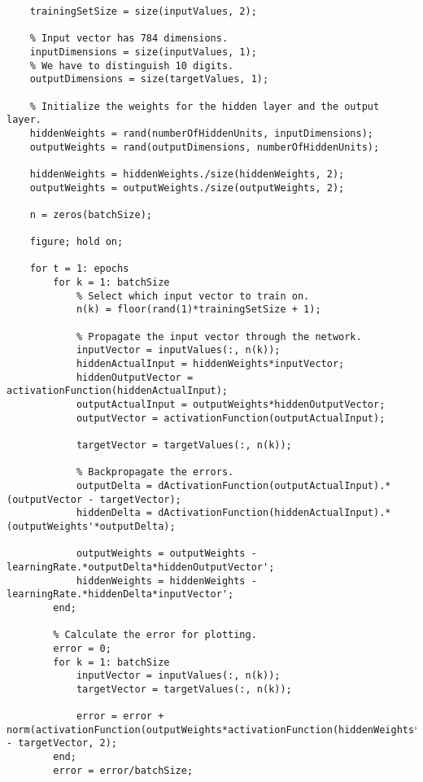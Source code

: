 \begin{appendices}
\begin{lstlisting}[label={lst:train-two-layer-perceptron}]
    % The number of training vectors.
    trainingSetSize = size(inputValues, 2);
    
    % Input vector has 784 dimensions.
    inputDimensions = size(inputValues, 1);
    % We have to distinguish 10 digits.
    outputDimensions = size(targetValues, 1);
    
    % Initialize the weights for the hidden layer and the output layer.
    hiddenWeights = rand(numberOfHiddenUnits, inputDimensions);
    outputWeights = rand(outputDimensions, numberOfHiddenUnits);
    
    hiddenWeights = hiddenWeights./size(hiddenWeights, 2);
    outputWeights = outputWeights./size(outputWeights, 2);
    
    n = zeros(batchSize);
    
    figure; hold on;

    for t = 1: epochs
        for k = 1: batchSize
            % Select which input vector to train on.
            n(k) = floor(rand(1)*trainingSetSize + 1);
            
            % Propagate the input vector through the network.
            inputVector = inputValues(:, n(k));
            hiddenActualInput = hiddenWeights*inputVector;
            hiddenOutputVector = activationFunction(hiddenActualInput);
            outputActualInput = outputWeights*hiddenOutputVector;
            outputVector = activationFunction(outputActualInput);
            
            targetVector = targetValues(:, n(k));
            
            % Backpropagate the errors.
            outputDelta = dActivationFunction(outputActualInput).*(outputVector - targetVector);
            hiddenDelta = dActivationFunction(hiddenActualInput).*(outputWeights'*outputDelta);
            
            outputWeights = outputWeights - learningRate.*outputDelta*hiddenOutputVector';
            hiddenWeights = hiddenWeights - learningRate.*hiddenDelta*inputVector';
        end;
        
        % Calculate the error for plotting.
        error = 0;
        for k = 1: batchSize
            inputVector = inputValues(:, n(k));
            targetVector = targetValues(:, n(k));
            
            error = error + norm(activationFunction(outputWeights*activationFunction(hiddenWeights*inputVector)) - targetVector, 2);
        end;
        error = error/batchSize;
        

\end{lstlisting}
\end{appendices}
